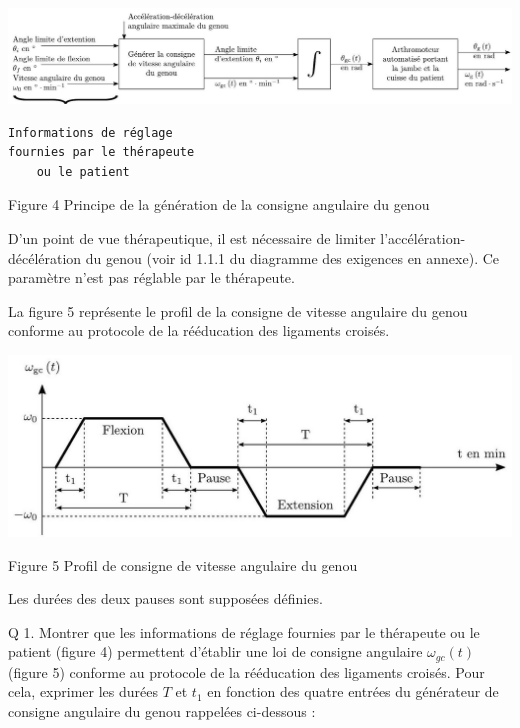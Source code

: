 \documentclass[10pt]{article}
\begin{document}
\begin{center}
\includegraphics[max width=\textwidth]{2024_07_14_a83aebba33898893d39fg-03(1)}
\end{center}

\begin{verbatim}
Informations de réglage
fournies par le thérapeute
    ou le patient
\end{verbatim}

Figure 4 Principe de la génération de la consigne angulaire du genou

D'un point de vue thérapeutique, il est nécessaire de limiter l'accélération-décélération du genou (voir id 1.1.1 du diagramme des exigences en annexe). Ce paramètre n'est pas réglable par le thérapeute.

La figure 5 représente le profil de la consigne de vitesse angulaire du genou conforme au protocole de la rééducation des ligaments croisés.

\begin{center}
\includegraphics[max width=\textwidth]{2024_07_14_a83aebba33898893d39fg-03}
\end{center}

Figure 5 Profil de consigne de vitesse angulaire du genou

Les durées des deux pauses sont supposées définies.

Q 1. Montrer que les informations de réglage fournies par le thérapeute ou le patient (figure 4) permettent d'établir une loi de consigne angulaire $\omega_{g c}(t)$ (figure 5) conforme au protocole de la rééducation des ligaments croisés. Pour cela, exprimer les durées $T$ et $t_{1}$ en fonction des quatre entrées du générateur de consigne angulaire du genou rappelées ci-dessous :
\end{document}
